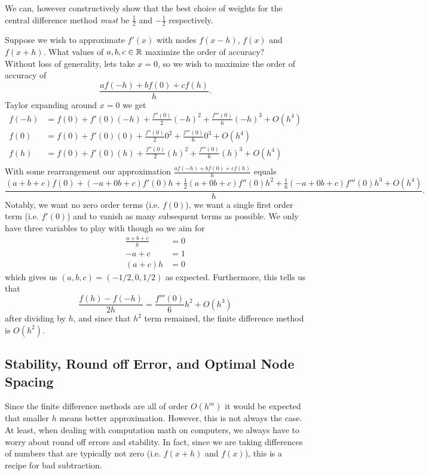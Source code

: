 \documentclass[11pt]{article}
\begin{document}
We can, however constructively show that the best choice of weights for the central difference method \textit{must} be $\frac{1}{2}$ and $-\frac{1}{2}$ respectively. 
\begin{example}
    Suppose we wish to approximate $f'(x)$ with nodes $f(x-h)$, $f(x)$ and $f(x+h)$. What values of $a, b, c \in \mathbb{R}$ maximize the order of accuracy?\\
    Without loss of generality, lets take $x = 0$, so we wish to maximize the order of accuracy of $$\frac{af(-h)+bf(0)+cf(h)}{h}.$$ 
    Taylor expanding around $x = 0$ we get \begin{align*}
        f(-h) &= f(0) + f'(0)(-h) + \frac{f''(0)}{2}(-h)^2 + \frac{f'''(0)}{6}(-h)^3 + O(h^4)\\
        f(0) &= f(0) + f'(0)(0) + \frac{f''(0)}{2}0^2 + \frac{f'''(0)}{6}0^3 + O(h^4)\\
        f(h) &= f(0) + f'(0)(h) + \frac{f''(0)}{2}(h)^2 + \frac{f'''(0)}{6}(h)^3 + O(h^4)\\
    \end{align*}
    With some rearrangement our approximation $\frac{af(-h)+bf(0)+cf(h)}{h}$ equals
    $$ \frac{(a+b+c)f(0)+(-a+0b+c)f'(0)h+\frac{1}{2}(a+0b+c)f''(0)h^2+\frac{1}{6}(-a+0b+c)f'''(0)h^3 + O(h^4)}{h}.$$
    Notably, we want no zero order terms (i.e. $f(0)$), we want a single first order term (i.e. $f'(0)$) and to vanish as many subsequent terms as possible. We only have three variables to play with though so we aim for \begin{align*}
         \frac{a + b + c}{h} &= 0\\
         -a + c &= 1\\
         (a+c)h &= 0
    \end{align*}
    which gives us $(a,b,c) = (-1/2, 0, 1/2)$ as expected. Furthermore, this tells us that $$\frac{f(h)-f(-h)}{2h} = \frac{f'''(0)}{6}h^2 + O(h^3)$$
    after dividing by $h$, and since that $h^2$ term remained, the finite difference method is $O(h^2)$.
\end{example}
\subsection{Stability, Round off Error, and Optimal Node Spacing}

Since the finite difference methods are all of order $O(h^m)$ it would be expected that smaller $h$ means better approximation. However, this is not always the case. At least, when dealing with computation math on computers, we always have to worry about round off errors and stability. In fact, since we are taking differences of numbers that are typically not zero (i.e. $f(x+h)$ and $f(x)$), this is a recipe for bad subtraction. 
\end{document}
